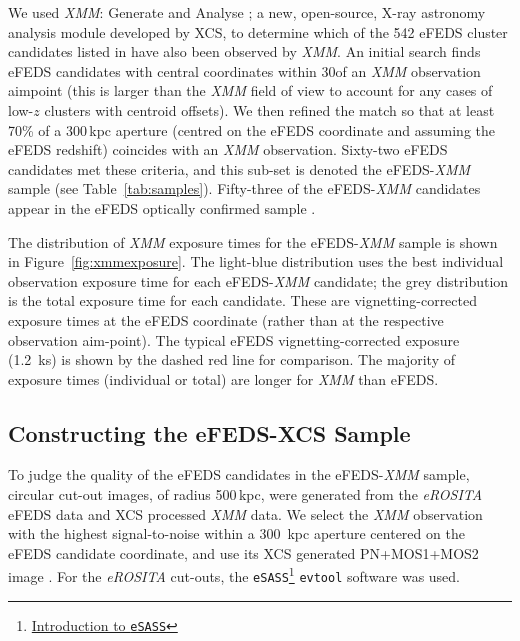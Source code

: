 \documentclass[fleqn,usenatbib]{mnras}
\begin{document}
We used {\em XMM}: Generate and Analyse \citep[\texttt{XGA}\footnote{\href{https://github.com/DavidT3/XGA}{{\em XMM}: Generate and Analyse GitHub}}][]{xgapaper}; a new, open-source, X-ray astronomy analysis module developed by XCS, to determine which of the 542 eFEDS cluster candidates listed in \cite{efedsclustercat} have also been observed by {\em XMM}.
An initial search finds eFEDS candidates with central coordinates within 30\arcmin of an {\em XMM} observation aimpoint (this is larger than the {\em XMM} field of view to account for any cases of low-$z$ clusters with centroid offsets). We then refined the match so that at least 70\% of a 300\,kpc aperture (centred on the eFEDS coordinate and assuming the eFEDS redshift) coincides with an {\em XMM} observation. Sixty-two eFEDS candidates met these criteria, and this sub-set is denoted the eFEDS-{\em XMM} sample (see Table~\ref{tab:samples}). Fifty-three of the eFEDS-{\em XMM} candidates appear in the eFEDS optically confirmed sample \citep[][]{efedsclusteropticalcat}.

The distribution of {\em XMM} exposure times for the eFEDS-{\em XMM} sample is shown in Figure~\ref{fig:xmmexposure}. The light-blue distribution uses the best individual observation exposure time for each eFEDS-{\em XMM} candidate; the grey distribution is the total exposure time for each candidate. These are vignetting-corrected exposure times at the eFEDS coordinate (rather than at the respective observation aim-point). The typical eFEDS vignetting-corrected exposure (1.2~ks) is shown by the dashed red line for comparison. The majority of exposure times (individual or total) are longer for {\em XMM} than eFEDS.

\subsection{Constructing the eFEDS-XCS Sample}
\label{sec:efeds-verification}

To judge the quality of the eFEDS candidates in the eFEDS-{\em XMM} sample, circular cut-out images, of radius 500\,kpc, were generated from the {\em eROSITA} eFEDS data and XCS processed {\em XMM} data. We select the {\em XMM} observation with the highest signal-to-noise within a 300~kpc aperture centered on the eFEDS candidate coordinate, and use its XCS generated PN+MOS1+MOS2 image \citep[][]{xcsgiles}. For the {\em eROSITA} cut-outs, the \texttt{eSASS}\footnote{\href{https://erosita.mpe.mpg.de/edr/DataAnalysis/}{Introduction to \texttt{eSASS}}} \texttt{evtool} software was used. 
\end{document}
